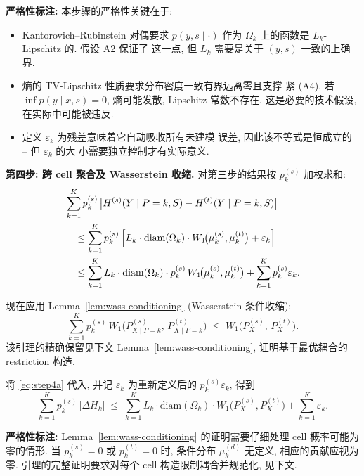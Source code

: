 \documentclass[12pt,a4paper]{article}
\newcommand{\diam}{\mathrm{diam}}
\newcommand{\annotation}{\medskip\noindent\textbf{严格性标注: }}
\begin{document}
\medskip\noindent
\annotation 本步骤的严格性关键在于:
\begin{itemize}
    \item Kantorovich--Rubinstein 对偶要求 $p(y,s\mid\cdot)$ 作为
          $\Omega_k$ 上的函数是 $L_k$-Lipschitz 的. 假设 A2 保证了
          这一点, 但 $L_k$ 需要是关于 $(y,s)$ 一致的上确界.
    \item 熵的 TV-Lipschitz 性质要求分布密度一致有界远离零且支撑
          紧 (A4). 若 $\inf p(y\mid x,s)=0$, 熵可能发散, Lipschitz
          常数不存在. 这是必要的技术假设, 在实际中可能被违反.
    \item 定义 $\varepsilon_k$ 为残差意味着它自动吸收所有未建模
          误差, 因此该不等式是恒成立的 -- 但 $\varepsilon_k$ 的大
          小需要独立控制才有实际意义.
\end{itemize}

\medskip\noindent
\textbf{第四步: 跨 cell 聚合及 Wasserstein 收缩.}
对第三步的结果按 $p^{(s)}_k$ 加权求和:
\begin{align*}
    &\sum_{k=1}^{K} p^{(s)}_k\,
       \bigl|H^{(s)}(Y\mid P=k,S)-H^{(t)}(Y\mid P=k,S)\bigr| \\
    &\quad\leq \sum_{k=1}^{K} p^{(s)}_k\,
       \Bigl[L_k\cdot\diam(\Omega_k)\cdot
       W_1\!\bigl(\mu^{(s)}_k,\mu^{(t)}_k\bigr) + \varepsilon_k\Bigr] \\
    &\quad\leq \sum_{k=1}^{K}
       L_k\cdot\diam(\Omega_k)\cdot p^{(s)}_k\,
       W_1\!\bigl(\mu^{(s)}_k,\mu^{(t)}_k\bigr)
       + \sum_{k=1}^{K} p^{(s)}_k\varepsilon_k.
\end{align*}

现在应用 Lemma~\ref{lem:wass-conditioning} (Wasserstein 条件收缩):
\begin{equation}\label{eq:step4a}
    \sum_{k=1}^{K} p^{(s)}_k\,
    W_1\!\bigl(P^{(s)}_{X\mid P=k},\,P^{(t)}_{X\mid P=k}\bigr)
    \;\leq\; W_1\!\bigl(P^{(s)}_X,\,P^{(t)}_X\bigr).
\end{equation}
该引理的精确保留见下文 Lemma~\ref{lem:wass-conditioning},
证明基于最优耦合的 restriction 构造.

将 \eqref{eq:step4a} 代入, 并记 $\varepsilon_k$ 为重新定义后的
$p^{(s)}_k\varepsilon_k$, 得到
\begin{equation}\label{eq:step4b}
    \sum_{k=1}^{K} p^{(s)}_k\,
    |\Delta H_k| \;\leq\;
    \sum_{k=1}^{K} L_k\cdot\diam(\Omega_k)\cdot
    W_1\!\bigl(P^{(s)}_X,P^{(t)}_X\bigr)
    + \sum_{k=1}^{K} \varepsilon_k.
\end{equation}
\checkmark

\medskip\noindent
\annotation Lemma~\ref{lem:wass-conditioning} 的证明需要仔细处理
cell 概率可能为零的情形. 当 $p^{(s)}_k=0$ 或 $p^{(t)}_k=0$ 时,
条件分布 $\mu^{(d)}_k$ 无定义, 相应的贡献应视为零.
引理的完整证明要求对每个 cell 构造限制耦合并规范化, 见下文.
\end{document}
